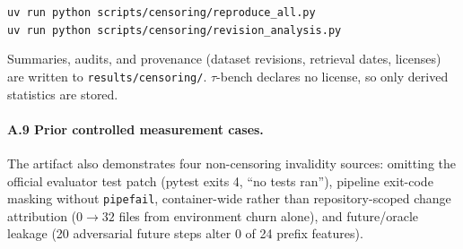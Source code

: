 \documentclass[letterpaper]{article} %
\begin{document}
\smallskip
{\small\raggedright
\texttt{uv run python scripts/censoring/reproduce\_all.py}\\
\texttt{uv run python scripts/censoring/revision\_analysis.py}\par}
\smallskip

\noindent Summaries, audits, and provenance (dataset revisions, retrieval
dates, licenses) are written to \texttt{results/censoring/}. $\tau$-bench
declares no license, so only derived statistics are stored.

\paragraph{A.9 Prior controlled measurement cases.} The artifact also
demonstrates four non-censoring invalidity sources: omitting the official
evaluator test patch (pytest exits 4, ``no tests ran''), pipeline exit-code
masking without \texttt{pipefail}, container-wide rather than repository-scoped
change attribution ($0\!\to\!32$ files from environment churn alone), and
future/oracle leakage (20 adversarial future steps alter 0 of 24 prefix
features).
\end{document}
